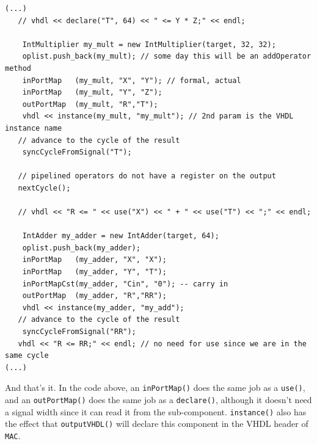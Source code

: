 \documentclass{article}
\begin{document}
\begin{verbatim}
(...)
   // vhdl << declare("T", 64) << " <= Y * Z;" << endl;

	IntMultiplier my_mult = new IntMultiplier(target, 32, 32);
	oplist.push_back(my_mult); // some day this will be an addOperator method
	inPortMap   (my_mult, "X", "Y"); // formal, actual
	inPortMap   (my_mult, "Y", "Z");
	outPortMap  (my_mult, "R","T");
	vhdl << instance(my_mult, "my_mult"); // 2nd param is the VHDL instance name
   // advance to the cycle of the result
	syncCycleFromSignal("T"); 

   // pipelined operators do not have a register on the output 
   nextCycle();

   // vhdl << "R <= " << use("X") << " + " << use("T") << ";" << endl;

	IntAdder my_adder = new IntAdder(target, 64);
	oplist.push_back(my_adder);
	inPortMap   (my_adder, "X", "X");
	inPortMap   (my_adder, "Y", "T");
	inPortMapCst(my_adder, "Cin", "0"); -- carry in
	outPortMap  (my_adder, "R","RR");
	vhdl << instance(my_adder, "my_add");
   // advance to the cycle of the result
	syncCycleFromSignal("RR"); 
   vhdl << "R <= RR;" << endl; // no need for use since we are in the same cycle
(...)
\end{verbatim}


And that's it. In the code above, an \verb!inPortMap()! does the same
job as a \verb!use()!, and an \verb!outPortMap()! does the same job as
a \verb!declare()!, although it doesn't need a signal width since it
can read it from the sub-component. \verb!instance()! also has the
effect that \verb!outputVHDL()! will declare this component in the
VHDL header of \verb!MAC!.
\end{document}
